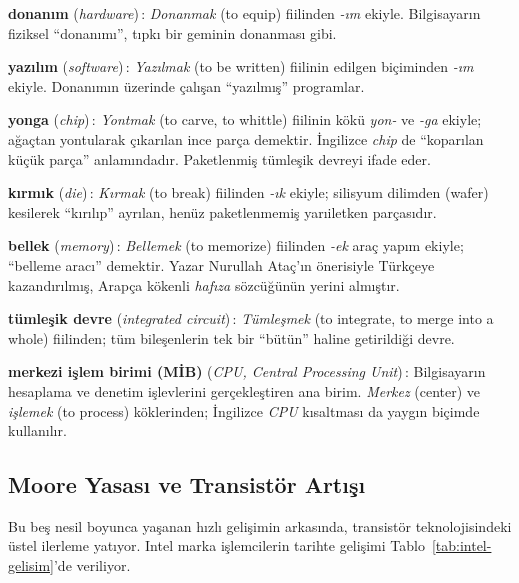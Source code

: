 \begin{terimnotu}
\textbf{donanım} (\emph{hardware})\,: \emph{Donanmak} (to equip) fiilinden \emph{-ım} ekiyle. Bilgisayarın fiziksel ``donanımı'', tıpkı bir geminin donanması gibi.

\textbf{yazılım} (\emph{software})\,: \emph{Yazılmak} (to be written) fiilinin edilgen biçiminden \emph{-ım} ekiyle. Donanımın üzerinde çalışan ``yazılmış'' programlar.

\textbf{yonga} (\emph{chip})\,: \emph{Yontmak} (to carve, to whittle) fiilinin kökü \emph{yon-} ve \emph{-ga} ekiyle; ağaçtan yontularak çıkarılan ince parça demektir. İngilizce \emph{chip} de ``koparılan küçük parça'' anlamındadır. Paketlenmiş tümleşik devreyi ifade eder.

\textbf{kırmık} (\emph{die})\,: \emph{Kırmak} (to break) fiilinden \emph{-ık} ekiyle; silisyum dilimden (wafer) kesilerek ``kırılıp'' ayrılan, henüz paketlenmemiş yarıiletken parçasıdır.

\textbf{bellek} (\emph{memory})\,: \emph{Bellemek} (to memorize) fiilinden \emph{-ek} araç yapım ekiyle; ``belleme aracı'' demektir. Yazar Nurullah Ataç'ın önerisiyle Türkçeye kazandırılmış, Arapça kökenli \emph{hafıza} sözcüğünün yerini almıştır.

\textbf{tümleşik devre} (\emph{integrated circuit})\,: \emph{Tümleşmek} (to integrate, to merge into a whole) fiilinden; tüm bileşenlerin tek bir ``bütün'' haline getirildiği devre.

\textbf{merkezi işlem birimi (MİB)} (\emph{CPU, Central Processing Unit})\,: Bilgisayarın hesaplama ve denetim işlevlerini gerçekleştiren ana birim. \emph{Merkez} (center) ve \emph{işlemek} (to process) köklerinden; İngilizce \emph{CPU} kısaltması da yaygın biçimde kullanılır.
\end{terimnotu}

\subsection{Moore Yasası ve Transistör Artışı}
\label{sec:moore-yasasi}

Bu beş nesil boyunca yaşanan hızlı gelişimin arkasında, transistör teknolojisindeki üstel ilerleme yatıyor. Intel marka işlemcilerin tarihte gelişimi Tablo~\ref{tab:intel-gelisim}'de veriliyor.

